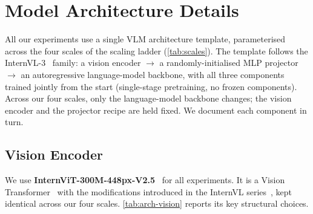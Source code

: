 
\section{Model Architecture Details}\label{app:architecture}

All our experiments use a single VLM architecture template, parameterised across the four scales of the scaling ladder (\cref{tab:scales}). The template follows the InternVL-3~\citep{zhu2025internvl3} family: a vision encoder $\rightarrow$ a randomly-initialised MLP projector $\rightarrow$ an autoregressive language-model backbone, with all three components trained jointly from the start (single-stage pretraining, no frozen components). Across our four scales, only the language-model backbone changes; the vision encoder and the projector recipe are held fixed. We document each component in turn.

\subsection{Vision Encoder}\label{app:arch-vision}

We use \textbf{InternViT-300M-448px-V2.5}~\citep{chen2024expanding} for all experiments. It is a Vision Transformer~\citep{dosovitskiy2020image} with the modifications introduced in the InternVL series~\citep{chen2024internvl,chen2024expanding,zhu2025internvl3}, kept identical across our four scales. \cref{tab:arch-vision} reports its key structural choices.


